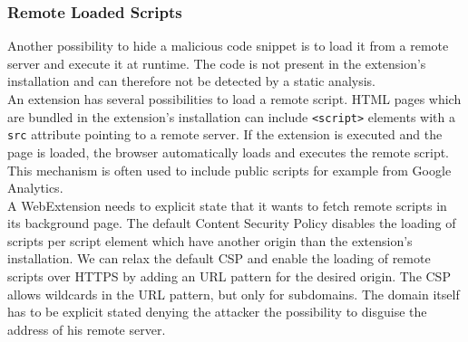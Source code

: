 		\subsubsection{Remote Loaded Scripts}
			
			Another possibility to hide a malicious code snippet is to load it from a remote server and execute it at runtime. The code is not present in the extension's installation and can therefore not be detected by a static analysis. \\
		
			An extension has several possibilities to load a remote script. HTML pages which are bundled in the extension's installation can include \texttt{<script>} elements with a \texttt{src} attribute pointing to a remote server. If the extension is executed and the page is loaded, the browser automatically loads and executes the remote script. This mechanism is often used to include public scripts for example from Google Analytics. \\
			A WebExtension needs to explicit state that it wants to fetch remote scripts in its background page. The default Content Security Policy disables the loading of scripts per script element which have another origin than the extension's installation. We can relax the default CSP and enable the loading of remote scripts over HTTPS by adding an URL pattern for the desired origin. The CSP allows wildcards in the URL pattern, but only for subdomains. The domain itself has to be explicit stated denying the attacker the possibility to disguise the address of his remote server. \\

